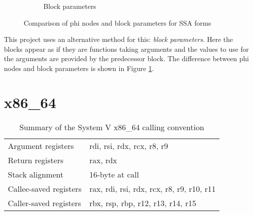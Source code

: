 \begin{figure}
\begin{subfigure}[b]{0.5\textwidth}

        \caption{Block parameters}

    \end{subfigure}
    \caption{Comparison of phi nodes and block parameters for SSA forms}
    \label{fig:phi-bp}
\end{figure}

This project uses an alternative method for this: \emph{block parameters}.
Here the blocks appear as if they are functions taking arguments and the values to use for the
arguments are provided by the predecessor block. The difference between phi nodes and block
parameters is shown in Figure \ref{fig:phi-bp}.

\section{x86\_64}

\begin{table}[h]
    \centering

    \begin{tabular}{ll}\toprule
        Argument registers     & rdi, rsi, rdx, rcx, r8, r9                \\
        Return registers       & rax, rdx                                  \\
        Stack alignment        & 16-byte at call                           \\
        Callee-saved registers & rax, rdi, rsi, rdx, rcx, r8, r9, r10, r11 \\
        Caller-saved registers & rbx, rsp, rbp, r12, r13, r14, r15         \\
        \bottomrule
    \end{tabular}

    \caption{Summary of the System V x86\_64 calling convention}
    \label{table:systemv}

\end{table}

